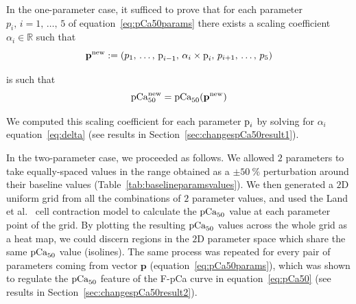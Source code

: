 \vspace{0.2cm}
In the one-parameter case, it sufficed to prove that for each parameter $p_i,\,i=1,\,\dots,\,5$ of equation~\eqref{eq:pCa50params} there exists a scaling coefficient $\alpha_i\in\mathbb{R}$ such that
%
\begin{equation}
    \mathbf{p}^{\text{new}} := (p_1,\,\dots,\,\textrm{p}_{i-1},\,\alpha_i\times\textrm{p}_i,\,p_{i+1},\,\dots,\,p_5)
\end{equation}

\vspace{0.2cm}
is such that
%
\begin{equation}
    \textrm{pCa}_{50}^{\text{new}} = \textrm{pCa}_{50}(\mathbf{p}^{\text{new}})
\end{equation}

\vspace{0.2cm}
We computed this scaling coefficient for each parameter $\textrm{p}_i$ by solving for $\alpha_i$ equation~\eqref{eq:delta} (see results in Section~\ref{sec:changespCa50result1}).

\vspace{0.2cm}
In the two-parameter case, we proceeded as follows. We allowed $2$ parameters to take equally-spaced values in the range obtained as a $\pm\SI{50}{\percent}$ perturbation around their baseline values (Table~\ref{tab:baselineparamsvalues}). We then generated a $2$D uniform grid from all the combinations of $2$ parameter values, and used the Land et al.~\cite{Land:2012} cell contraction model to calculate the $\textrm{pCa}_{50}$ value at each parameter point of the grid. By plotting the resulting $\textrm{pCa}_{50}$ values across the whole grid as a heat map, we could discern regions in the $2$D parameter space which share the same $\textrm{pCa}_{50}$ value (isolines). The same process was repeated for every pair of parameters coming from vector $\mathbf{p}$ (equation~\eqref{eq:pCa50params}), which was shown to regulate the $\textrm{pCa}_{50}$ feature of the F-pCa curve in equation~\eqref{eq:pCa50} (see results in Section~\ref{sec:changespCa50result2}).


%
%
%
